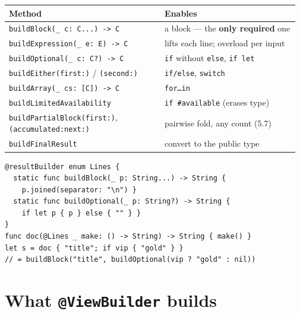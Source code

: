 \documentclass[8pt]{extarticle}
\begin{document}
\begin{multicols}{2}
{\scriptsize
\begin{tabular}{@{}L{0.52\linewidth}L{0.45\linewidth}@{}}
\toprule
\textbf{Method} & \textbf{Enables} \\ \midrule
\texttt{buildBlock(\_ c: C...) -> C} & a block — the \textbf{only required} one \\
\texttt{buildExpression(\_ e: E) -> C} & lifts each line; overload per input \\
\texttt{buildOptional(\_ c: C?) -> C} & \texttt{if} without \texttt{else}, \texttt{if let} \\
\texttt{buildEither(first:)} / \texttt{(second:)} & \texttt{if/else}, \texttt{switch} \\
\texttt{buildArray(\_ cs: [C]) -> C} & \texttt{for\ldots in} \\
\texttt{buildLimitedAvailability} & \texttt{if \#available} (erases type) \\
\texttt{buildPartialBlock(first:)}, \texttt{(accumulated:next:)} & pairwise fold, any count (5.7) \\
\texttt{buildFinalResult} & convert to the public type \\
\bottomrule
\end{tabular}}

\begin{lstlisting}[language=SwiftSheet]
@resultBuilder enum Lines {
  static func buildBlock(_ p: String...) -> String {
    p.joined(separator: "\n") }
  static func buildOptional(_ p: String?) -> String {
    if let p { p } else { "" } }
}
func doc(@Lines _ make: () -> String) -> String { make() }
let s = doc { "title"; if vip { "gold" } }
// = buildBlock("title", buildOptional(vip ? "gold" : nil))
\end{lstlisting}

\section{What \texttt{@ViewBuilder} builds}


\end{multicols}
\end{document}
